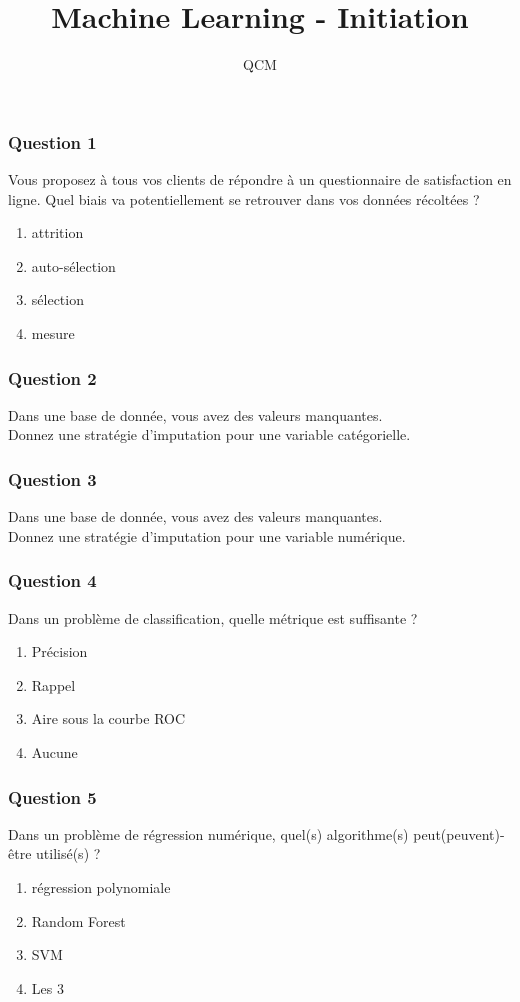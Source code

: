 \documentclass{formation}
\title{Machine Learning - Initiation}
\subtitle{QCM}
\begin{document}
\maketitle

\begin{frame}
  \frametitle{Question 1}
  Vous proposez à tous vos clients de répondre à un questionnaire de satisfaction en ligne. Quel  biais va potentiellement se retrouver dans vos données récoltées ?
  \begin{enumerate}
  \item attrition
  \item auto-sélection
  \item sélection
  \item mesure
  \end{enumerate}
\end{frame}

\begin{frame}
  \frametitle{Question 2}
  Dans une base de donnée, vous avez des valeurs manquantes. \\
  Donnez une stratégie d'imputation pour une variable catégorielle.
\end{frame}

\begin{frame}
  \frametitle{Question 3}
  Dans une base de donnée, vous avez des valeurs manquantes. \\
  Donnez une stratégie d'imputation pour une variable numérique.
\end{frame}

\begin{frame}
  \frametitle{Question 4}
  Dans un problème de classification, quelle métrique est suffisante ?
  \begin{enumerate}
  \item Précision
  \item Rappel
  \item Aire sous la courbe ROC
  \item Aucune
  \end{enumerate}
\end{frame}

\begin{frame}
  \frametitle{Question 5}
  Dans un problème de régression numérique, quel(s) algorithme(s) peut(peuvent)-être utilisé(s) ?
  \begin{enumerate}
  \item régression polynomiale
  \item Random Forest
  \item SVM
  \item Les 3
  \end{enumerate}
\end{frame}
\end{document}
